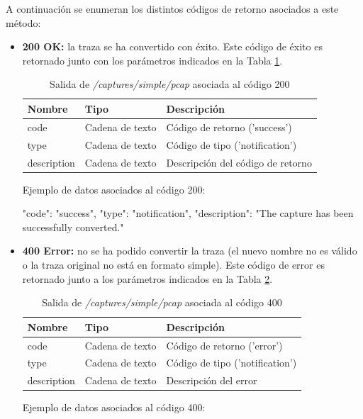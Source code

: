 A continuación se enumeran los distintos códigos de retorno asociados a este método:
\begin{itemize}

\item{\textbf{200 OK:} la \gls{traza} se ha convertido con éxito. Este código de éxito es retornado junto con los parámetros indicados en la Tabla \ref{extra:api:capturessimplepcap:ok}.
\begin{table}[H]
\centering
\begin{tabular}{|l|l|l|}
\hline
\rowcolor[HTML]{F5F5F5}
\textbf{Nombre}  & \textbf{Tipo}   & \textbf{Descripción}              \\ \hline
code             & Cadena de texto & Código de retorno ('success')     \\ \hline
type             & Cadena de texto & Código de tipo ('notification')   \\ \hline
description      & Cadena de texto & Descripción del código de retorno \\ \hline
\end{tabular}
\caption{Salida de \textit{/captures/simple/pcap} asociada al código 200}
\label{extra:api:capturessimplepcap:ok}
\end{table}
\begin{minipage}{\textwidth}
Ejemplo de datos asociados al código 200:

\begin{code}[language=json]
{
  "code": "success",
  "type": "notification",
  "description": "The capture has been successfully converted."
}
\end{code}
\end{minipage}
}

\item{\textbf{400 Error:} no se ha podido convertir la \gls{traza} (el nuevo nombre no es válido o la \gls{traza} original no está en formato \gls{simple}). Este código de error es retornado junto a los parámetros indicados en la Tabla \ref{extra:api:capturessimplepcap:error}.
\begin{table}[H]
\centering
\begin{tabular}{|l|l|l|}
\hline
\rowcolor[HTML]{F5F5F5}
\textbf{Nombre}  & \textbf{Tipo}   & \textbf{Descripción}            \\ \hline
code             & Cadena de texto & Código de retorno ('error')     \\ \hline
type             & Cadena de texto & Código de tipo ('notification') \\ \hline
description      & Cadena de texto & Descripción del error           \\ \hline
\end{tabular}
\caption{Salida de \textit{/captures/simple/pcap} asociada al código 400}
\label{extra:api:capturessimplepcap:error}
\end{table}
\begin{minipage}{\textwidth}
Ejemplo de datos asociados al código 400:


\end{minipage}}
\end{itemize}
